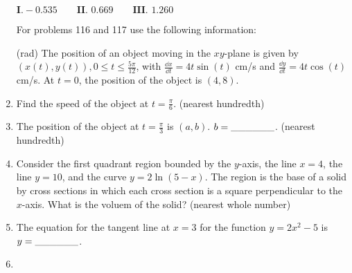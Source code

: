 \documentclass[../uilmath.tex]{subfiles}
\begin{document}
\begin{enumerate}[label=\bfseries\arabic*.]
    $\textbf{I.} -0.535 \qquad \textbf{II. } 0.669 \qquad \textbf{III. } 1.260$


    For problems 116 and 117 use the following information:

    (rad) The position of an object moving in the $xy$-plane is given by $(x(t),y(t)), 0\leq t\leq \frac{5\pi}{12}$, with $\frac{\dd x}{\dd t} = 4t\sin(t)$ cm/s and 
    $\frac{\dd y}{\dd t} = 4t\cos(t)$ cm/s. At $t=0$, the position of the object is $(4,8)$.
    \item %
    Find the speed of the object at $t=\frac{\pi}{6}$. (nearest hundredth)

    \item %
    The position of the object at $t=\frac{\pi}{3}$ is $(a,b)$. $b=\_\_\_\_\_\_$. (nearest hundredth)

    \item %
    Consider the first quadrant region bounded by the $y$-axis, the line $x=4$, the line $y=10$, and the curve $y=2\ln(5-x)$. The region is the base of a solid 
    by cross sections in which each cross section is a square perpendicular to the $x$-axis. What is the voluem of the solid? (nearest whole number)

    \item %
    The equation for the tangent line at $x=3$ for the function $y=2x^2-5$ is $y=\_\_\_\_\_\_$.

    \item %
    
    
\end{enumerate}
\end{document}
